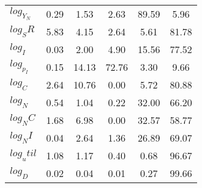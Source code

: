 \begin{center}
\begin{longtable}{lccccc}
$log_Y_N   $	 & 	        0.29	 & 	        1.53	 & 	        2.63	 & 	       89.59	 & 	        5.96 \\ 
$log_SR    $	 & 	        5.83	 & 	        4.15	 & 	        2.64	 & 	        5.61	 & 	       81.78 \\ 
$log_I     $	 & 	        0.03	 & 	        2.00	 & 	        4.90	 & 	       15.56	 & 	       77.52 \\ 
$log_p_I   $	 & 	        0.15	 & 	       14.13	 & 	       72.76	 & 	        3.30	 & 	        9.66 \\ 
$log_C     $	 & 	        2.64	 & 	       10.76	 & 	        0.00	 & 	        5.72	 & 	       80.88 \\ 
$log_N     $	 & 	        0.54	 & 	        1.04	 & 	        0.22	 & 	       32.00	 & 	       66.20 \\ 
$log_NC    $	 & 	        1.68	 & 	        6.98	 & 	        0.00	 & 	       32.57	 & 	       58.77 \\ 
$log_NI    $	 & 	        0.04	 & 	        2.64	 & 	        1.36	 & 	       26.89	 & 	       69.07 \\ 
$log_util  $	 & 	        1.08	 & 	        1.17	 & 	        0.40	 & 	        0.68	 & 	       96.67 \\ 
$log_D     $	 & 	        0.02	 & 	        0.04	 & 	        0.01	 & 	        0.27	 & 	       99.66 \\ 
\end{longtable}
 \end{center}
